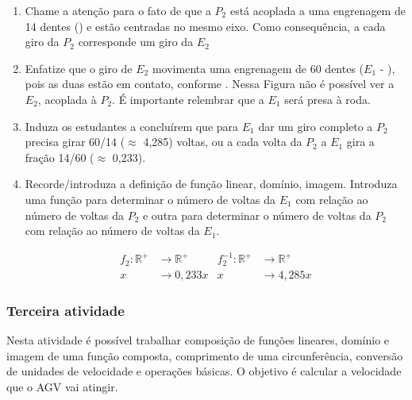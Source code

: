 \documentclass{textolivre}
\begin{document}
\begin{enumerate}
\item Chame a atenção para o fato de que a $P_2$ está acoplada a uma engrenagem de
14 dentes () e estão centradas no mesmo eixo. Como consequência, a
cada giro da $P_2$ corresponde um giro da $E_2$
\item Enfatize que o giro de $E_2$ movimenta uma engrenagem de 60 dentes
($E_1$ - ), pois as duas estão em contato, conforme . Nessa
Figura não é possível ver a $E_2$, acoplada à $P_2$. É importante relembrar que a $E_1$
será presa à roda.
\item Induza os estudantes a concluírem que para $E_1$ dar um giro completo a $P_2$
precisa girar 60/14 ($\approx$ 4,285) voltas, ou a cada volta da $P_2$ a $E_1$ gira a fração
14/60 ($\approx$ 0,233).
\item Recorde/introduza a definição de função linear, domínio, imagem.
Introduza uma função para determinar o número de voltas da $E_1$ com relação ao
número de voltas da $P_2$ e outra para determinar o número de voltas da $P_2$
com relação ao número de voltas da $E_1$.

    \begin{align*}
    f_2: \mathbb{R}^{+} &\rightarrow \mathbb{R}^{+} & f_{2}^{-1}: \mathbb{R}^{+} &\rightarrow \mathbb{R}^{+} \\
    x &\rightarrow 0,233x & x &\rightarrow 4,285x \nonumber
    \end{align*}

\end{enumerate}



\subsubsection{Terceira atividade}\label{sec-terceira}

Nesta atividade é possível trabalhar composição de funções lineares, domínio e
imagem de uma função composta, comprimento de uma circunferência, conversão de
unidades de velocidade e operações básicas. O objetivo é calcular a velocidade
que o AGV vai atingir.
\end{document}
